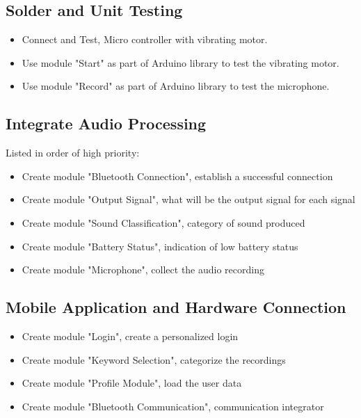\documentclass[12pt, titlepage]{article}
\begin{document}
\subsection{Solder and Unit Testing}
\begin{itemize}
\item Connect and Test, Micro controller with vibrating motor.
\item Use module "Start" as part of Arduino library to test the vibrating motor.
\item Use module "Record" as part of Arduino library to test the microphone.
\end{itemize}



\subsection{Integrate Audio Processing}

Listed in order of high priority:
\begin{itemize}
\item Create module "Bluetooth Connection", establish a successful connection
\item Create module "Output Signal", what will be the output signal for each signal
\item Create module "Sound Classification", category of sound produced
\item Create module "Battery Status", indication of low battery status
\item Create module "Microphone", collect the audio recording
\end{itemize}

\subsection{Mobile Application and Hardware Connection}

\begin{itemize}
\item Create module "Login", create a personalized login
\item Create module "Keyword Selection", categorize the recordings
\item Create module "Profile Module", load the user data
\item Create module "Bluetooth Communication", communication integrator
\end{itemize}

\newpage{}
\end{document}
